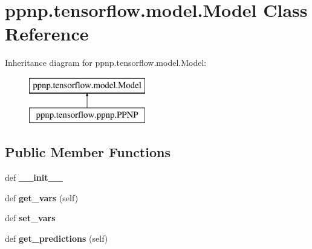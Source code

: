 \hypertarget{classppnp_1_1tensorflow_1_1model_1_1Model}{}\section{ppnp.\+tensorflow.\+model.\+Model Class Reference}
\label{classppnp_1_1tensorflow_1_1model_1_1Model}
Inheritance diagram for ppnp.\+tensorflow.\+model.\+Model\+:\begin{figure}[H]
\begin{center}
\leavevmode
\includegraphics[height=2.000000cm]{classppnp_1_1tensorflow_1_1model_1_1Model}
\end{center}
\end{figure}
\subsection*{Public Member Functions}
\begin{DoxyCompactItemize}
\item 
\mbox{\label{classppnp_1_1tensorflow_1_1model_1_1Model_aef189749998de025808152f676f8196a}} 
def {\bfseries \+\_\+\+\_\+init\+\_\+\+\_\+}
\item 
\mbox{\label{classppnp_1_1tensorflow_1_1model_1_1Model_a07f3063318ba257a476fc0f8fe0d7ac7}} 
def {\bfseries get\+\_\+vars} (self)
\item 
\mbox{\label{classppnp_1_1tensorflow_1_1model_1_1Model_a0ed2c282c6dd6ec6e1b86955033f8f09}} 
def {\bfseries set\+\_\+vars}
\item 
\mbox{\label{classppnp_1_1tensorflow_1_1model_1_1Model_a22c7416a63f14281403909613b40b977}} 
def {\bfseries get\+\_\+predictions} (self)
\end{DoxyCompactItemize}
